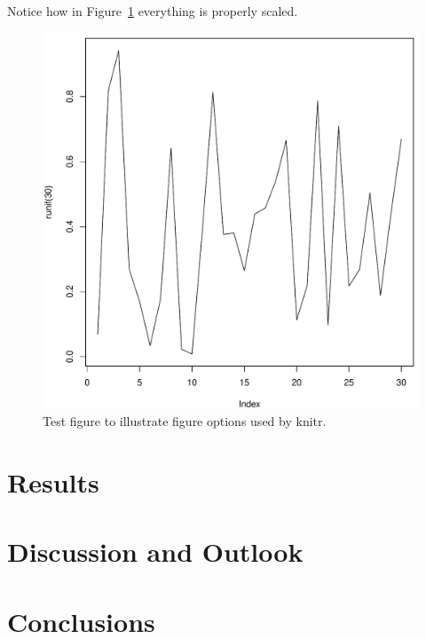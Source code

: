 \documentclass[11pt,a4paper,twoside]{book}\usepackage[]{graphicx}\usepackage[]{color}
\makeatletter
\def\maxwidth{ %
  \ifdim\Gin@nat@width>\linewidth
    \linewidth
  \else
    \Gin@nat@width
  \fi
}
\newenvironment{knitrout}{}{} %
\makeatother
\begin{document}
\bigskip 

Notice how in Figure~\ref{f02:1} everything is properly scaled.   

\begin{figure}
\begin{knitrout}
\color{fgcolor}
\includegraphics[width=\maxwidth]{figure/ch01_figunnamed-chunk-3-1} 

\end{knitrout}
  \caption{Test figure to illustrate figure options used by knitr.}
  \label{f02:1}
\end{figure}




\chapter{Results}




\chapter{Discussion and Outlook}





\chapter{Conclusions}
\cleardoublepage
{}
{}


 


\cleardoublepage
\end{document}
